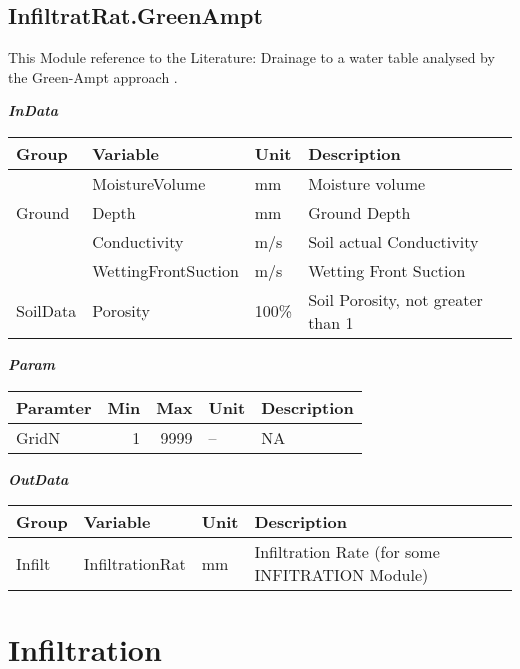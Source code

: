 \documentclass[
]{book}
\begin{document}
\hypertarget{infiltratrat.greenampt}{%
\subsection{InfiltratRat.GreenAmpt}\label{infiltratrat.greenampt}}

This Module reference to the Literature: Drainage to a water table analysed by the Green-Ampt approach \citep{Youngs.1976}.

\textbf{\emph{InData}}

\begin{table}[!h]
\centering
\begin{tabular}{l|l|l|l}
\hline
Group & Variable & Unit & Description\\
\hline
 & MoistureVolume & mm & Moisture volume\\
\cline{2-4}
\multirow{-2}{*}{\raggedright\arraybackslash Ground} & Depth & mm & Ground Depth\\
\cline{1-4}
 & Conductivity & m/s & Soil actual Conductivity\\
\cline{2-4}
 & WettingFrontSuction & m/s & Wetting Front Suction\\
\cline{2-4}
\multirow{-3}{*}{\raggedright\arraybackslash SoilData} & Porosity & 100\% & Soil Porosity, not greater than 1\\
\hline
\end{tabular}
\end{table}

\textbf{\emph{Param}}

\begin{table}[!h]
\centering
\begin{tabular}{l|r|r|l|l}
\hline
Paramter & Min & Max & Unit & Description\\
\hline
GridN & 1 & 9999 & -- & NA\\
\hline
\end{tabular}
\end{table}

\textbf{\emph{OutData}}

\begin{table}[!h]
\centering
\begin{tabular}{l|l|l|l}
\hline
Group & Variable & Unit & Description\\
\hline
Infilt & InfiltrationRat & mm & Infiltration Rate (for some INFITRATION Module)\\
\hline
\end{tabular}
\end{table}

\hypertarget{infiltration}{%
\section{Infiltration}\label{infiltration}}
\end{document}
